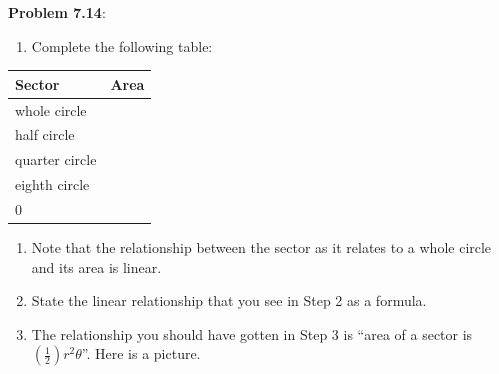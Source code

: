 \documentclass[english]{book}
\begin{document}
\textbf{Problem 7.14}:
\begin{enumerate}
  \item[\hspace{1cm}1)] Complete the following table:
\end{enumerate}

\begin{center}
\begin{table}[htbp]
\begin{center}
\begin{tabular}{|l|l|}
  \hline 
  Sector         & Area   \\
  \hline 
  whole circle   & \qquad \\
  half circle    &        \\
  quarter circle &        \\
  eighth circle  &        \\
  0              &        \\
  \hline
\end{tabular}
\label{tbl7.14hint}
\end{center}
\end{table}
\end{center}

\begin{enumerate}
  \item[\hspace{1cm}2)] Note that the relationship between the sector as it relates to a whole circle and its area is linear.
  \item[\hspace{1cm}3)] State the linear relationship that you see in Step 2 as a formula.
  \item[\hspace{1cm}4)] The relationship you should have gotten in Step 3 is ``area of a sector is $(\frac{1}{2})r^{2} \theta$''. Here is a picture.
\end{enumerate}
\end{document}
